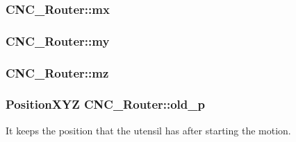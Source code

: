 \hypertarget{class_c_n_c___router_aa6009653314607491aa277b1f3c9bf85}{
\subsubsection[{mx}]{ C\+N\+C\+\_\+\+Router\+::mx\hspace{0.3cm}{\ttfamily [private]}}}\label{class_c_n_c___router_aa6009653314607491aa277b1f3c9bf85}
\hypertarget{class_c_n_c___router_ac3fb4521615d90ff7baa6bdb287d97c9}{
\subsubsection[{my}]{ C\+N\+C\+\_\+\+Router\+::my\hspace{0.3cm}{\ttfamily [private]}}}\label{class_c_n_c___router_ac3fb4521615d90ff7baa6bdb287d97c9}
\hypertarget{class_c_n_c___router_add549ccc206f5feff41f9e818e370ef8}{
\subsubsection[{mz}]{ C\+N\+C\+\_\+\+Router\+::mz\hspace{0.3cm}{\ttfamily [private]}}}\label{class_c_n_c___router_add549ccc206f5feff41f9e818e370ef8}
\hypertarget{class_c_n_c___router_afd338336ec37545574369a5f71ff310b}{
\subsubsection[{old\+\_\+p}]{\setlength{\rightskip}{0pt plus 5cm}Position\+X\+Y\+Z C\+N\+C\+\_\+\+Router\+::old\+\_\+p\hspace{0.3cm}{\ttfamily [private]}}}\label{class_c_n_c___router_afd338336ec37545574369a5f71ff310b}


It keeps the position that the utensil has after starting the motion. 

